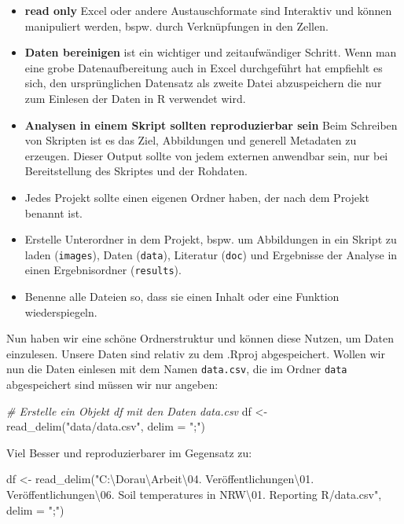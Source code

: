 \documentclass[
]{article}
\newenvironment{Shaded}{\begin{snugshade}}{\end{snugshade}}
\newcommand{\AttributeTok}[1]{\textcolor[rgb]{0.77,0.63,0.00}{#1}}
\newcommand{\CommentTok}[1]{\textcolor[rgb]{0.56,0.35,0.01}{\textit{#1}}}
\newcommand{\FunctionTok}[1]{\textcolor[rgb]{0.00,0.00,0.00}{#1}}
\newcommand{\NormalTok}[1]{#1}
\newcommand{\OtherTok}[1]{\textcolor[rgb]{0.56,0.35,0.01}{#1}}
\newcommand{\SpecialCharTok}[1]{\textcolor[rgb]{0.00,0.00,0.00}{#1}}
\newcommand{\StringTok}[1]{\textcolor[rgb]{0.31,0.60,0.02}{#1}}
\providecommand{\tightlist}{%
  \setlength{\itemsep}{0pt}\setlength{\parskip}{0pt}}
\begin{document}
\begin{itemize}
\tightlist
\item
  \textbf{read only} Excel oder andere Austauschformate sind Interaktiv und können manipuliert werden, bspw. durch Verknüpfungen in den Zellen.
\item
  \textbf{Daten bereinigen} ist ein wichtiger und zeitaufwändiger Schritt. Wenn man eine grobe Datenaufbereitung auch in Excel durchgeführt hat empfiehlt es sich, den ursprünglichen Datensatz als zweite Datei abzuspeichern die nur zum Einlesen der Daten in R verwendet wird.
\item
  \textbf{Analysen in einem Skript sollten reproduzierbar sein} Beim Schreiben von Skripten ist es das Ziel, Abbildungen und generell Metadaten zu erzeugen. Dieser Output sollte von jedem externen anwendbar sein, nur bei Bereitstellung des Skriptes und der Rohdaten.
\item
  Jedes Projekt sollte einen eigenen Ordner haben, der nach dem Projekt benannt ist.
\item
  Erstelle Unterordner in dem Projekt, bspw. um Abbildungen in ein Skript zu laden (\texttt{images}), Daten (\texttt{data}), Literatur (\texttt{doc}) und Ergebnisse der Analyse in einen Ergebnisordner (\texttt{results}).
\item
  Benenne alle Dateien so, dass sie einen Inhalt oder eine Funktion wiederspiegeln.
\end{itemize}

Nun haben wir eine schöne Ordnerstruktur und können diese Nutzen, um Daten einzulesen. Unsere Daten sind relativ zu dem .Rproj abgespeichert. Wollen wir nun die Daten einlesen mit dem Namen \texttt{data.csv}, die im Ordner \texttt{data} abgespeichert sind müssen wir nur angeben:

\begin{Shaded}
\begin{Highlighting}[]
\CommentTok{\# Erstelle ein Objekt df mit den Daten data.csv}
\NormalTok{df }\OtherTok{\textless{}{-}} \FunctionTok{read\_delim}\NormalTok{(}\StringTok{"data/data.csv"}\NormalTok{, }\AttributeTok{delim =} \StringTok{";"}\NormalTok{)}
\end{Highlighting}
\end{Shaded}

Viel Besser und reproduzierbarer im Gegensatz zu:

\begin{Shaded}
\begin{Highlighting}[]
\NormalTok{df }\OtherTok{\textless{}{-}} \FunctionTok{read\_delim}\NormalTok{(}\StringTok{"C:\textbackslash{}Dorau\textbackslash{}Arbeit}\SpecialCharTok{\textbackslash{}04}\StringTok{. Veröffentlichungen}\SpecialCharTok{\textbackslash{}01}\StringTok{. Veröffentlichungen}\SpecialCharTok{\textbackslash{}06}\StringTok{. Soil temperatures in NRW}\SpecialCharTok{\textbackslash{}01}\StringTok{. Reporting R/data.csv"}\NormalTok{, }\AttributeTok{delim =} \StringTok{";"}\NormalTok{)}
\end{Highlighting}
\end{Shaded}
\end{document}
